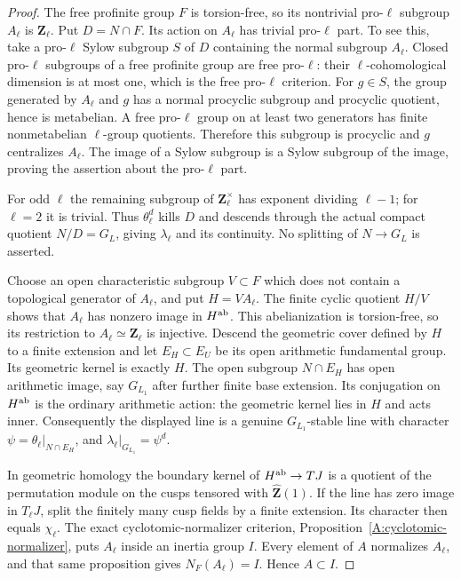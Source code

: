 \documentclass[11pt,oneside]{article}
\begin{document}
\begin{proof}
The free profinite group $F$ is torsion-free, so its
nontrivial pro-$\ell$ subgroup $A_\ell$ is
$\mathbf Z_\ell$. Put $D=N\cap F$. Its action on
$A_\ell$ has trivial pro-$\ell$ part. To see this,
take a pro-$\ell$ Sylow subgroup $S$ of $D$ containing
the normal subgroup $A_\ell$. Closed pro-$\ell$
subgroups of a free profinite group are free pro-$\ell$:
their $\ell$-cohomological dimension is at most one,
which is the free pro-$\ell$ criterion. For $g\in S$,
the group generated by $A_\ell$ and $g$ has a normal
procyclic subgroup and procyclic quotient, hence is
metabelian. A free pro-$\ell$ group on at least two
generators has finite nonmetabelian $\ell$-group
quotients. Therefore this subgroup is procyclic and
$g$ centralizes $A_\ell$. The image of a Sylow
subgroup is a Sylow subgroup of the image, proving
the assertion about the pro-$\ell$ part.

For odd $\ell$ the remaining subgroup of
$\mathbf Z_\ell^\times$ has exponent dividing
$\ell-1$; for $\ell=2$ it is trivial. Thus
$\theta_\ell^d$ kills $D$ and descends through the
actual compact quotient $N/D=G_L$, giving
$\lambda_\ell$ and its continuity. No splitting of
$N\to G_L$ is asserted.

Choose an open characteristic subgroup $V\subset F$
which does not contain a topological generator of
$A_\ell$, and put $H=VA_\ell$. The finite cyclic
quotient $H/V$ shows that $A_\ell$ has nonzero image
in $H^{\rm ab}$. This abelianization is torsion-free,
so its restriction to $A_\ell\simeq\mathbf Z_\ell$
is injective. Descend the geometric cover defined by
$H$ to a finite extension and let $E_H\subset E_U$
be its open arithmetic fundamental group. Its
geometric kernel is exactly $H$. The open subgroup
$N\cap E_H$ has open arithmetic image, say
$G_{L_1}$ after further finite base extension.
Its conjugation on $H^{\rm ab}$ is the ordinary
arithmetic action: the geometric kernel lies in $H$
and acts inner. Consequently the displayed line is
a genuine $G_{L_1}$-stable line with character
$\psi=\theta_\ell|_{N\cap E_H}$, and
$\lambda_\ell|_{G_{L_1}}=\psi^d$.

In geometric homology the boundary kernel of
$H^{\rm ab}\to T J$ is a quotient of the permutation
module on the cusps tensored with
$\widehat{\mathbf Z}(1)$. If the line has zero image
in $T_\ell J$, split the finitely many cusp fields
by a finite extension. Its character then equals
$\chi_\ell$. The exact cyclotomic-normalizer
criterion, Proposition~\ref{A:cyclotomic-normalizer},
puts $A_\ell$ inside an inertia group $I$.
Every element of $A$ normalizes $A_\ell$, and that
same proposition gives $N_F(A_\ell)=I$. Hence
$A\subset I$.


\end{proof}
\end{document}
